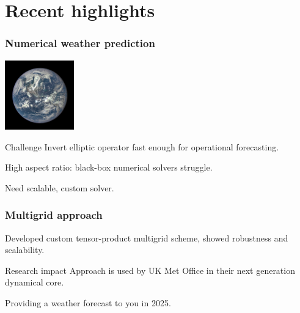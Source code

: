 \documentclass[presentation]{beamer}
\begin{document}
\section{Recent highlights}
\begin{frame}
  \frametitle{Numerical weather prediction}
  \begin{center}
    \includegraphics[width=3cm]{earth}
  \end{center}
  \begin{block}{Challenge}
    Invert elliptic operator fast enough for operational forecasting.

    High aspect ratio: black-box numerical solvers struggle.

    Need scalable, custom solver.
  \end{block}
\end{frame}
\begin{frame}
  \frametitle{Multigrid approach}
  \begin{center}
    \end{center}
    Developed custom tensor-product multigrid scheme, showed robustness
    and scalability.

  \begin{block}{Research impact}
    Approach is used by UK Met Office in their next generation dynamical
    core.

    Providing a weather forecast to you in 2025.
  \end{block}
\end{frame}
\end{document}
